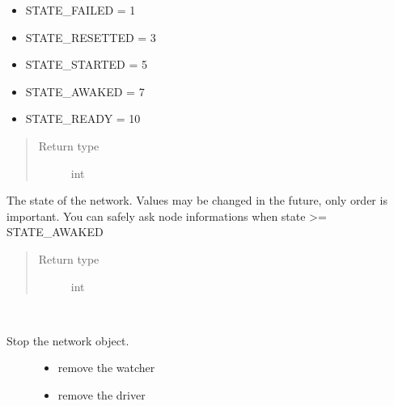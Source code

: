 \documentclass[letterpaper,10pt,english]{sphinxmanual}
\begin{document}
\begin{fulllineitems}
\begin{fulllineitems}
\begin{itemize}
\item {} 
STATE\_FAILED = 1

\item {} 
STATE\_RESETTED = 3

\item {} 
STATE\_STARTED = 5

\item {} 
STATE\_AWAKED = 7

\item {} 
STATE\_READY = 10

\end{itemize}
\begin{quote}\begin{description}
\item[{Return type}] \leavevmode
int

\end{description}\end{quote}

\end{fulllineitems}


\begin{fulllineitems}
\label{network:openzwave.network.ZWaveNetwork.state_str}
The state of the network. Values may be changed in the future,
only order is important.
You can safely ask node informations when state \textgreater{}= STATE\_AWAKED
\begin{quote}\begin{description}
\item[{Return type}] \leavevmode
int

\end{description}\end{quote}

\end{fulllineitems}


\begin{fulllineitems}
\label{network:openzwave.network.ZWaveNetwork.stop}~\begin{description}
\item[{Stop the network object.}] \leavevmode\begin{itemize}
\item {} 
remove the watcher

\item {} 
remove the driver


\end{itemize}
\end{description}
\end{fulllineitems}
\end{fulllineitems}
\end{document}
